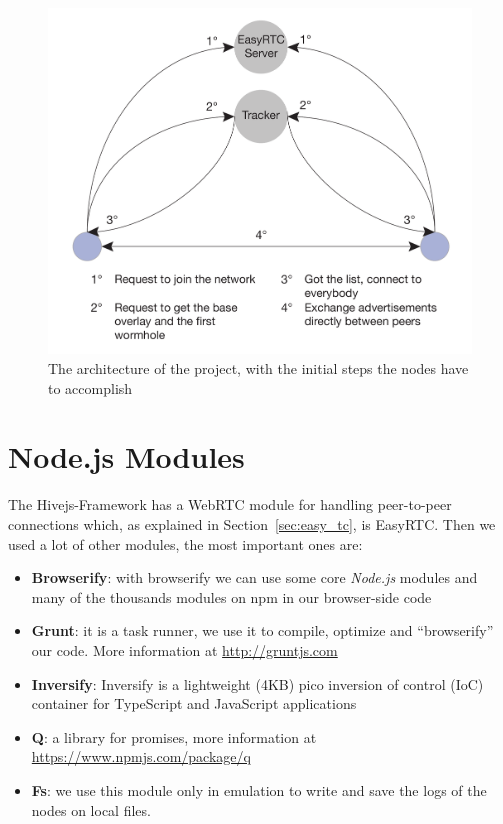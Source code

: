 \begin{figure}[ht]
  \centering
  \includegraphics[keepaspectratio=true, width=\textwidth]{images/project_architecture}\caption{The architecture of the project, with the initial steps the nodes have to accomplish}
  \label{fig:project_architecture}
\end{figure}


\section{Node.js Modules}
\label{sec:modules}
The Hivejs-Framework has a WebRTC module for handling peer-to-peer connections which, as explained in Section~\ref{sec:easy_tc}, is EasyRTC. Then we used a lot of other modules, the most important ones are:

\begin{itemize}
	\item \textbf{Browserify}: with browserify we can use some core \textit{Node.js} modules and many of the thousands modules on npm in our browser-side code
	\item \textbf{Grunt}: it is a task runner, we use it to compile, optimize and ``browserify'' our code. More information at \url{http://gruntjs.com}
	\item \textbf{Inversify}: Inversify is a lightweight (4KB) pico inversion of control (IoC) container for TypeScript and JavaScript applications
	\item \textbf{Q}: a library for promises, more information at \url{https://www.npmjs.com/package/q}
	\item \textbf{Fs}: we use this module only in emulation to write and save the logs of the nodes on local files.
\end{itemize}

